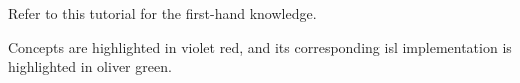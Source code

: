 Refer to this tutorial\cite{verdoolaege2016presburger} for the first-hand knowledge.

Concepts are highlighted in \textcolor{vr}{violet red}, and its corresponding isl implementation is highlighted in \textcolor{og}{oliver green}.




